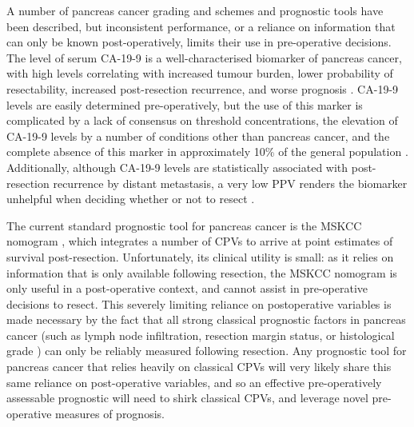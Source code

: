 \documentclass[dissertation.tex]{subfiles}
\begin{document}
A number of pancreas cancer grading and schemes and prognostic tools have been described, but inconsistent performance, or a reliance on information that can only be known post-operatively, limits their use in pre-operative decisions.  The level of serum \gls{CA-19-9} is a well-characterised biomarker of pancreas cancer, with high levels correlating with increased tumour burden, lower probability of resectability, increased post-resection recurrence, and worse prognosis \cite{Kim2011, Ballehaninna2012, Barugola2007, Lundin1994}.  \Gls{CA-19-9} levels are easily determined pre-operatively, but the use of this marker is complicated by a lack of consensus on threshold concentrations, the elevation of \gls{CA-19-9} levels by a number of conditions other than pancreas cancer, and the complete absence of this marker in approximately 10\% of the general population \cite{Ballehaninna2012}.  Additionally, although \gls{CA-19-9} levels are statistically associated with post-resection recurrence by distant metastasis, a very low \gls{PPV} renders the biomarker unhelpful when deciding whether or not to resect \cite{Kim2011}.

The current standard prognostic tool for pancreas cancer is the \gls{MSKCC} nomogram \cite{Brennan2004}, which integrates a number of \glspl{CPV} to arrive at point estimates of survival post-resection.  Unfortunately, its clinical utility is small: as it relies on information that is only available following resection, the \gls{MSKCC} nomogram is only useful in a post-operative context, and cannot assist in pre-operative decisions to resect.  This severely limiting reliance on postoperative variables is made necessary by the fact that all strong classical prognostic factors in pancreas cancer (such as lymph node infiltration, resection margin status, or histological grade \cite{Bilici2014}) can only be reliably measured following resection.  Any prognostic tool for pancreas cancer that relies heavily on classical \glspl{CPV} will very likely share this same reliance on post-operative variables, and so an effective pre-operatively assessable prognostic will need to shirk classical \glspl{CPV}, and leverage novel pre-operative measures of prognosis.
\end{document}
